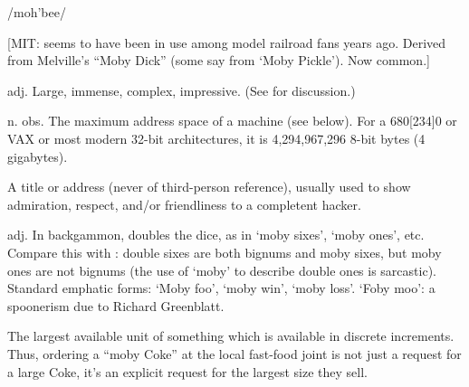  /moh'bee/

[MIT: seems to have been in use among model railroad fans years ago. Derived
from Melville's ``Moby Dick'' (some say from `Moby Pickle').  Now common.]
\begin{inparaenum}
	\item adj. Large, immense, complex, impressive.
		 (See  for discussion.)

	\item n. obs. The maximum address space of a machine (see below). For a
		680[234]0 or VAX or most modern 32-bit architectures, it is
		4,294,967,296 8-bit bytes (4 gigabytes).

	\item A title or address (never of third-person reference), usually used to
		show admiration, respect, and/or friendliness to a completent hacker.

	\item adj. In backgammon, doubles the dice, as in `moby sixes', `moby
		ones', etc. Compare this with : double sixes are
		both bignums and moby sixes, but moby ones are not bignums (the use of
		`moby' to describe double ones is sarcastic). Standard emphatic forms:
		`Moby foo', `moby win', `moby loss'. `Foby moo': a spoonerism due to
		Richard Greenblatt.

	\item The largest available unit of something which is available in
		discrete increments. Thus, ordering a ``moby Coke'' at the local
		fast-food joint is not just a request for a large Coke, it's an
		explicit request for the largest size they sell.
\end{inparaenum}

